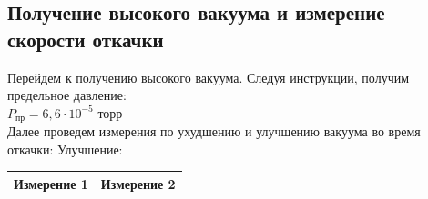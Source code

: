 \documentclass[a4paper, 12pt]{article}
\begin{document}
\subsection{Получение высокого вакуума и измерение скорости откачки}
Перейдем к получению высокого вакуума. Следуя инструкции, получим предельное давление:\\
$P_{\text{пр}} = 6,6 \cdot 10^{-5}$ $\text{торр}$\\
Далее проведем измерения по ухудшению и улучшению вакуума во время откачки:
Улучшение:
\begin{table}[H]
\begin{tabular}{|ccc|ccc|}
\hline
\multicolumn{3}{|c|}{Измерение 1}                             & \multicolumn{3}{c|}{Измерение 2}                            \\ \hline


\end{tabular}
\end{table}
\end{document}
